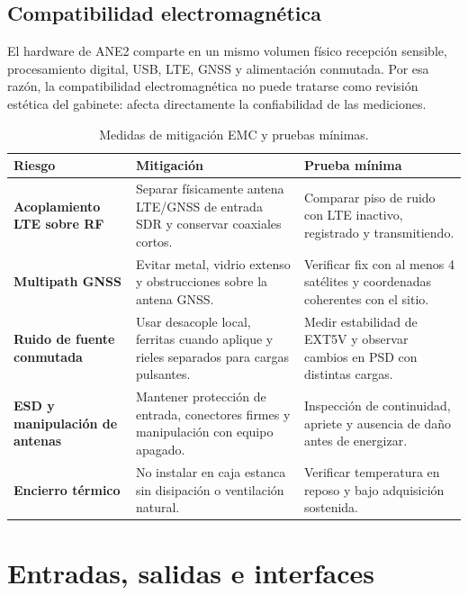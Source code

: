 \subsection{Compatibilidad electromagnética}

El hardware de ANE2 comparte en un mismo volumen físico recepción sensible,
procesamiento digital, USB, LTE, GNSS y alimentación conmutada. Por esa razón,
la compatibilidad electromagnética no puede tratarse como revisión estética del
gabinete: afecta directamente la confiabilidad de las mediciones.

\begin{table}[H]
\centering
\caption{Medidas de mitigación EMC y pruebas mínimas.}
\label{tab:hw_emc}
\begin{tabularx}{\textwidth}{>{\bfseries}p{3cm} p{4.4cm} X}
\toprule
Riesgo & Mitigación & Prueba mínima \\
\midrule
Acoplamiento LTE sobre RF & Separar físicamente antena LTE/GNSS de entrada SDR y conservar coaxiales cortos. & Comparar piso de ruido con LTE inactivo, registrado y transmitiendo. \\
Multipath GNSS & Evitar metal, vidrio extenso y obstrucciones sobre la antena GNSS. & Verificar fix con al menos 4 satélites y coordenadas coherentes con el sitio. \\
Ruido de fuente conmutada & Usar desacople local, ferritas cuando aplique y rieles separados para cargas pulsantes. & Medir estabilidad de EXT5V y observar cambios en PSD con distintas cargas. \\
ESD y manipulación de antenas & Mantener protección de entrada, conectores firmes y manipulación con equipo apagado. & Inspección de continuidad, apriete y ausencia de daño antes de energizar. \\
Encierro térmico & No instalar en caja estanca sin disipación o ventilación natural. & Verificar temperatura en reposo y bajo adquisición sostenida. \\
\bottomrule
\end{tabularx}
\end{table}

\section{Entradas, salidas e interfaces}

